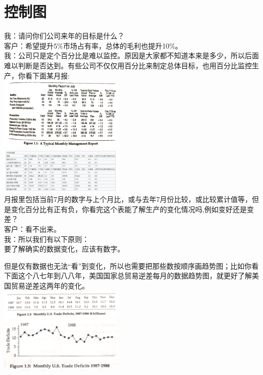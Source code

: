 \chapter{控制图} %

我：请问你们公司来年的目标是什么？\\
客户：希望提升5\%市场占有率，总体的毛利也提升10\%。\\
我：公司只是定个百分比是难以监控。原因是大家都不知道本来是多少，所以后面难以判断是否达到。有些公司不仅仅用百分比来制定总体目标，也用百分比监控生产，你看下面某月报:\\
\includegraphics[width=6cm]{The_key_fig111.png}\\

\includegraphics[width=6cm]{Screenshotfrom2023-02-1703-04-26.png}\\

月报里包括当前7月的数字与上个月比，或与去年7月份比较，或比较累计值等，但是变化百分比有正有负，你看完这个表能了解生产的变化情况吗,例如变好还是变差？\\
客户：看不出来。\\
我：所以我们有以下原则：\\
要了解确实的数据变化，应该有数字。

但是仅有数据也无法``看''到变化，所以也需要把那些数按顺序画趋势图；比如你看下面这个八七年到八八年，美国国家总贸易逆差每月的数据趋势图，就更好了解美国贸易逆差这两年的变化。\\
\includegraphics[width=6cm]{The_key_fig131.png}\\
\includegraphics[width=6cm]{The_key_fig151.png}\\


